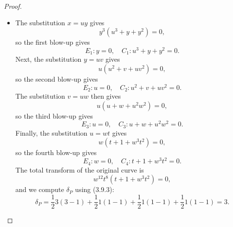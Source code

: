 \documentclass[a4paper]{article}
\begin{document}
\begin{enumerate} [label=\textbf{\arabic*.}, leftmargin=0em]
\begin{proof}
\begin{itemize} [leftmargin=0cm]
                  \item[(c)] The substitution $x = uy$ gives
                        \begin{equation*}
                            y^3(u^3 + y + y^2) = 0,
                        \end{equation*}
                        so the first blow-up gives
                        \begin{equation*}
                            E_1 : y = 0, \quad C_1 : u^3 + y + y^2 = 0.
                        \end{equation*}
                        Next, the substitution $y = uv$ gives
                        \begin{equation*}
                            u(u^2 + v + uv^2) = 0,
                        \end{equation*}
                        so the second blow-up gives
                        \begin{equation*}
                            E_2 : u = 0, \quad C_2 : u^2 + v + uv^2 = 0.
                        \end{equation*}
                        The substitution $v = uw$ then gives
                        \begin{equation*}
                            u(u + w + u^2w^2) = 0,
                        \end{equation*}
                        so the third blow-up gives
                        \begin{equation*}
                            E_3 : u = 0, \quad C_3 : u + w + u^2w^2 = 0.
                        \end{equation*}
                        Finally, the substitution $u = wt$ gives
                        \begin{equation*}
                            w(t + 1 + w^3t^2) = 0,
                        \end{equation*}
                        so the fourth blow-up gives
                        \begin{equation*}
                            E_4 : w = 0, \quad C_4 : t + 1 + w^3t^2 = 0.
                        \end{equation*}
                        The total transform of the original curve is
                        \begin{equation*}
                            w^{12}t^8(t + 1 + w^3t^2) = 0,
                        \end{equation*}
                        and we compute $\delta_P$ using (3.9.3):
                        \begin{equation*}
                            \delta_P = \frac{1}{2}3(3 - 1) + \frac{1}{2}1(1 - 1) + \frac{1}{2}1(1 - 1) + \frac{1}{2}1(1 - 1) = 3.
                        \end{equation*}


\end{itemize}
\end{proof}
\end{enumerate}
\end{document}

